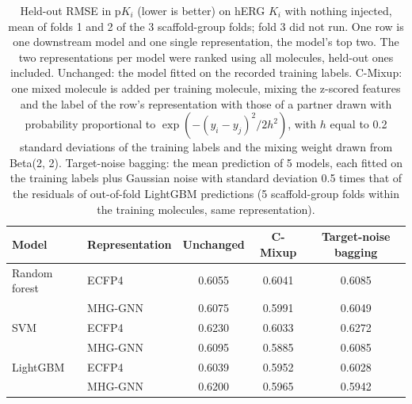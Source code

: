 \begin{table}[htbp]
\centering
\small
\begin{tabular}{@{}llccc@{}}
\toprule
Model & Representation & Unchanged & C-Mixup & Target-noise bagging \\
\midrule
Random forest & ECFP4 & 0.6055 & 0.6041 & 0.6085 \\
 & MHG-GNN & 0.6075 & 0.5991 & 0.6049 \\
\addlinespace
SVM & ECFP4 & 0.6230 & 0.6033 & 0.6272 \\
 & MHG-GNN & 0.6095 & 0.5885 & 0.6085 \\
\addlinespace
LightGBM & ECFP4 & 0.6039 & 0.5952 & 0.6028 \\
 & MHG-GNN & 0.6200 & 0.5965 & 0.5942 \\
\bottomrule
\end{tabular}
\caption[C-Mixup and target-noise bagging on the recorded hERG $K_i$ labels]{Held-out RMSE in p$K_i$ (lower is better) on hERG $K_i$ with nothing injected, mean of folds 1 and 2 of the 3 scaffold-group folds; fold 3 did not run. One row is one downstream model and one single representation, the model's top two. The two representations per model were ranked using all molecules, held-out ones included. Unchanged: the model fitted on the recorded training labels. C-Mixup: one mixed molecule is added per training molecule, mixing the z-scored features and the label of the row's representation with those of a partner drawn with probability proportional to $\exp(-(y_i-y_j)^2/2h^2)$, with $h$ equal to 0.2 standard deviations of the training labels and the mixing weight drawn from Beta(2, 2). Target-noise bagging: the mean prediction of 5 models, each fitted on the training labels plus Gaussian noise with standard deviation 0.5 times that of the residuals of out-of-fold LightGBM predictions (5 scaffold-group folds within the training molecules, same representation).}
\label{tab:ch6prelim_level0_mixup}
\end{table}


